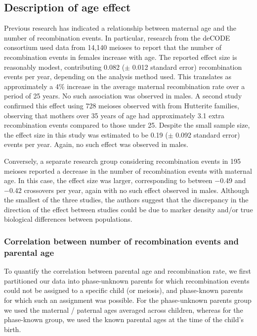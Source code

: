 \subsection{Description of age effect}
 
Previous research has indicated a relationship between maternal age and
the number of recombination events. In particular, research from the
deCODE consortium used data from 14,140 meioses to report that the number
of recombination events in females increase with age\cite{Kong2004}. The reported effect size
is reasonably modest, contributing 0.082 ($\pm$ 0.012 standard error)
recombination events per year, depending on the analysis method used. This
translates as approximately a 4\% increase in the average maternal recombination
rate over a period of 25 years. No such association was observed in males.  A
second study confirmed this effect using 728 meioses observed with
from Hutterite families\cite{Coop2008}, observing that mothers over 35 years of age had
approximately 3.1 extra recombination events compared to those under 25. Despite
the small sample size, the effect size in this study was estimated to be 0.19 
($\pm$ 0.092 standard error) events per year. Again, no such effect was observed in
males.   
 
Conversely, a separate research group considering recombination events in 195
meioses reported a decrease in the number of recombination events with maternal
age\cite{Hussin2011}. In this case, the effect size was larger, corresponding to between 
$-$0.49 and $-$0.42 crossovers per year, again with no such effect observed in
males. Although the smallest of the three studies, the authors suggest that the
discrepancy in the direction of the effect between studies could be due to
marker density and/or true biological differences between populations.

\subsubsection{Correlation between number of recombination events and parental age} %

To quantify the correlation between parental age and recombination rate,
we first partitioned our data into phase-unknown parents for which
recombination events could not be assigned to a specific child (or meiosis), and
phase-known parents for which such an assignment was possible. For the
phase-unknown parents group we used the maternal / paternal ages averaged
across children, whereas for the phase-known group, we used the known parental
ages at the time of the child's birth.

